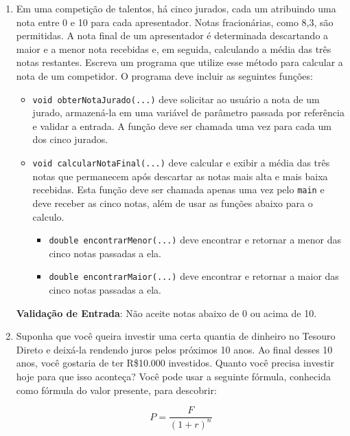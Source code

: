 \documentclass[12pt]{article}
\begin{document}
\begin{enumerate}
    \item Em uma competição de talentos, há cinco jurados, cada um atribuindo uma nota entre 0 e 10 para cada apresentador. Notas fracionárias, como 8,3, são permitidas. A nota final de um apresentador é determinada descartando a maior e a menor nota recebidas e, em seguida, calculando a média das três notas restantes. Escreva um programa que utilize esse método para calcular a nota de um competidor. O programa deve incluir as seguintes funções:

          \begin{itemize}
              \item  \texttt{void obterNotaJurado(...)} deve solicitar ao usuário a nota de um jurado, armazená-la em uma variável de parâmetro passada por referência e validar a entrada. A função deve ser chamada uma vez para cada um dos cinco jurados.
              \item  \texttt{void calcularNotaFinal(...)} deve calcular e exibir a média das três notas que permanecem após descartar as notas mais alta e mais baixa recebidas. Esta função deve ser chamada apenas uma vez pelo \texttt{main} e deve receber as cinco notas, além de usar as funções abaixo para o calculo.
                    \begin{itemize}
                        \item  \texttt{double encontrarMenor(...)} deve encontrar e retornar a menor das cinco notas passadas a ela.
                        \item  \texttt{double encontrarMaior(...)} deve encontrar e retornar a maior das cinco notas passadas a ela.
                    \end{itemize}
          \end{itemize}

          \textbf{Validação de Entrada}: Não aceite notas abaixo de 0 ou acima de 10.

    \item Suponha que você queira investir uma certa quantia de dinheiro no Tesouro Direto e deixá-la rendendo juros pelos próximos 10 anos. Ao final desses 10 anos, você gostaria de ter R\$10.000 investidos. Quanto você precisa investir hoje para que isso aconteça? Você pode usar a seguinte fórmula, conhecida como fórmula do valor presente, para descobrir:

          \begin{equation*}
              P = \frac{F}{(1 + r)^n}
          \end{equation*}


\end{enumerate}
\end{document}
